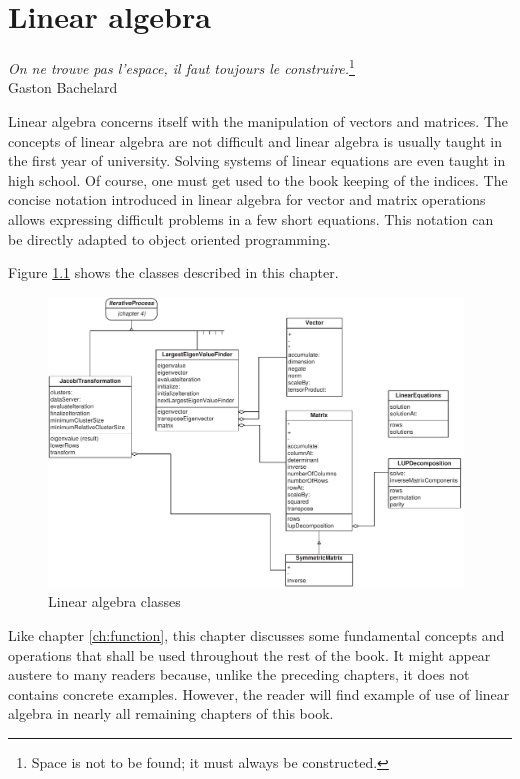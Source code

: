 \documentclass[twoside]{book}
\begin{document}
\fi

\chapter{Linear algebra}
\label{ch:linearalgebra}
\begin{flushright}
{\sl On ne trouve pas l'espace, il faut toujours le
construire.}\footnote{Space is not to be found; it must always be
constructed.}\\ Gaston Bachelard
\end{flushright}
\vspace{1 ex} Linear algebra concerns itself with the manipulation
of vectors and matrices. The concepts of linear algebra are not
difficult and linear algebra is usually taught in the first year
of university. Solving systems of linear equations are even taught
in high school. Of course, one must get used to the book keeping
of the indices. The concise notation introduced in linear algebra
for vector and matrix operations allows expressing difficult
problems in a few short equations. This notation can be directly
adapted to object oriented programming.

Figure \ref{fig:linearalgebraclasses} shows the classes described
in this chapter.
\begin{figure}
\centering\includegraphics[width=11cm]{Figures/LinearAlgebraClasses}
\caption{Linear algebra classes}\label{fig:linearalgebraclasses}
\end{figure}
Like chapter \ref{ch:function}, this chapter discusses some
fundamental concepts and operations that shall be used throughout
the rest of the book. It might appear austere to many readers
because, unlike the preceding chapters, it does not contains
concrete examples. However, the reader will find example of use of
linear algebra in nearly all remaining chapters of this book.
\end{document}
